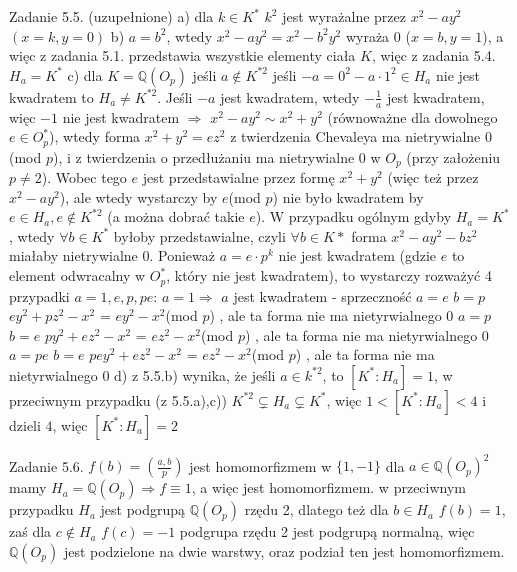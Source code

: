 \documentclass{article}
\begin{document}
Zadanie 5.5. (uzupełnione)
\newline
\newline
a) dla $k\in K^*$ $k^2$ jest wyrażalne przez $x^2-ay^2$ $(x=k,y=0)$\newline
b) $a=b^2$, wtedy $x^2-ay^2=x^2-b^2y^2$ wyraża $0$ ($x=b,y=1$), a więc z zadania 5.1. przedstawia wszystkie elementy ciała $K$, więc z zadania 5.4. $H_a=K^*$\newline
c) dla $K=\mathbb{Q}(O_p)$ jeśli $a\notin K^{*2}$ jeśli $-a=0^2-a\cdot1^2\in H_a$ nie jest kwadratem to $H_a\neq K^{*2}$.\newline
Jeśli $-a$ jest kwadratem, wtedy $-\frac{1}{a}$ jest kwadratem, więc $-1$ nie jest kwadratem $\Rightarrow$\newline
$x^2-ay^2\sim x^2+y^2$ (równoważne dla dowolnego $e\in O_p^*$),
wtedy forma $x^2+y^2=ez^2$ z twierdzenia Chevaleya ma nietrywialne $0$(mod $p$), i z twierdzenia o przedłużaniu ma nietrywialne $0$ w $O_p$ (przy założeniu $p\neq2$).\newline
Wobec tego $e$ jest przedstawialne przez formę $x^2+y^2$ (więc też przez $x^2-ay^2$),
ale wtedy wystarczy by $e$(mod $p$) nie było kwadratem by $e\in H_a,e\notin K^{*2}$ (a można dobrać takie $e$).\newline
W przypadku ogólnym gdyby $H_a=K^*$, wtedy $\forall b\in K^*$ byłoby przedstawialne, czyli $\forall b\in K*$ forma $x^2-ay^2-bz^2$ miałaby nietrywialne $0$.
Ponieważ $a=e\cdot p^k$ nie jest kwadratem (gdzie $e$ to element odwracalny w $O_p^*$, który nie jest kwadratem), to wystarczy rozważyć 4 przypadki $a=1,e,p,pe$:\newline
$a=1\Rightarrow$ $a$ jest kwadratem - sprzeczność\newline
$a=e$ $b=p$ $ey^2+pz^2-x^2$ = $ey^2-x^2$(mod $p$) , ale ta forma nie ma nietyrwialnego $0$\newline
$a=p$ $b=e$ $py^2+ez^2-x^2$ = $ez^2-x^2$(mod $p$) , ale ta forma nie ma nietyrwialnego $0$\newline
$a=pe$ $b=e$ $pey^2+ez^2-x^2$ = $ez^2-x^2$(mod $p$) , ale ta forma nie ma nietyrwialnego $0$\newline
d) z 5.5.b) wynika, że jeśli $a\in k^{*2}$, to $[K^*:H_a]=1$, w przeciwnym przypadku (z 5.5.a),c)) $K^{*2}\subsetneq H_a\subsetneq K^{*}$,
więc $1<[K^*:H_a]<4$ i dzieli $4$, więc $[K^*:H_a]=2$
\newline

Zadanie 5.6.
\newline
\newline
$f(b)=(\frac{a,b}{p})$ jest homomorfizmem w $\{1,-1\}$\newline
dla $a\in \mathbb{Q}(O_p)^2$ mamy $H_a=\mathbb{Q}(O_p)\Rightarrow f\equiv1$, a więc jest homomorfizmem.\newline
w przeciwnym przypadku $H_a$ jest podgrupą $\mathbb{Q}(O_p)$ rzędu 2, dlatego też dla $b\in H_a$ $f(b)=1$, zaś dla $c\notin H_a$ $f(c)=-1$\newline
podgrupa rzędu 2 jest podgrupą normalną, więc $\mathbb{Q}(O_p)$ jest podzielone na dwie warstwy, oraz podział ten jest homomorfizmem.
\newline
\end{document}
